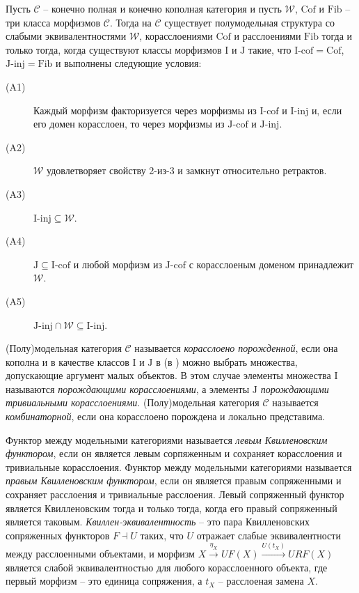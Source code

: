 \documentclass[reqno]{amsart}
\theoremstyle{definition}
\theoremstyle{remark}
\newcommand{\cat}[1]{\mathcal{#1}}
\renewcommand{\C}{\cat{C}}
\newcommand{\we}{\mathcal{W}}
\newcommand{\fib}{\mathrm{Fib}}
\newcommand{\cof}{\mathrm{Cof}}
\newcommand{\I}{\mathrm{I}}
\newcommand{\J}{\mathrm{J}}
\newcommand{\class}[2]{#1\text{-}\mathrm{#2}}
\newcommand{\Iinj}[1][\I]{\class{#1}{inj}}
\newcommand{\Icof}[1][\I]{\class{#1}{cof}}
\newcommand{\Jinj}[1][]{\Iinj[\J#1]}
\newcommand{\Jcof}[1][]{\Icof[\J#1]}
\begin{document}
\begin{prop}
Пусть $\C$ -- конечно полная и конечно кополная категория и пусть $\we$, $\cof$ и $\fib$ -- три класса морфизмов $\C$.
Тогда на $\C$ существует полумодельная структура со слабыми эквивалентностями $\we$, корасслоениями $\cof$ и расслоениями $\fib$ тогда и только тогда,
когда существуют классы морфизмов $\I$ и $\J$ такие, что $\Icof = \cof$, $\Jinj = \fib$ и выполнены следующие условия:
\begin{description}
\item[(A1)] Каждый морфизм факторизуется через морфизмы из $\Icof$ и $\Iinj$ и, если его домен корасслоен, то через морфизмы из $\Jcof$ и $\Jinj$.
\item[(A2)] $\we$ удовлетворяет свойству 2-из-3 и замкнут относительно ретрактов.
\item[(A3)] $\Iinj \subseteq \we$.
\item[(A4)] $\J \subseteq \Icof$ и любой морфизм из $\Jcof$ с корасслоеным доменом принадлежит $\we$.
\item[(A5)] $\Jinj \cap \we \subseteq \Iinj$.
\end{description}
\end{prop}

\begin{defn}
(Полу)модельная категория $\C$ называется \emph{корасслоено порожденной}, если она кополна и в качестве классов $\I$ и $\J$ в  (в ) можно выбрать множества, допускающие аргумент малых объектов.
В этом случае элементы множества $\I$ называются \emph{порождающими корасслоениями}, а элементы $\J$ \emph{порождающими тривиальными корасслоениями}.
(Полу)модельная категория $\C$ называется \emph{комбинаторной}, если она корасслоено порождена и локально представима.
\end{defn}

Функтор между модельными категориями называется \emph{левым Квилленовским функтором}, если он является левым сорпяженным и сохраняет корасслоения и тривиальные корасслоения.
Функтор между модельными категориями называется \emph{правым Квилленовским функтором}, если он является правым сопряженными и сохраняет расслоения и тривиальные расслоения.
Левый сопряженный функтор является Квилленовским тогда и только тогда, когда его правый сопряженный является таковым.
\emph{Квиллен-эквивалентность} -- это пара Квилленовских сопряженных функторов $F \dashv U$ таких, что $U$ отражает слабые эквивалентности между расслоенными объектами,
и морфизм $X \xrightarrow{\eta_X} UF(X) \xrightarrow{U(t_X)} URF(X)$ является слабой эквивалентностью для любого корасслоенного объекта, где первый морфизм -- это единица сопряжения, а $t_X$ -- расслоеная замена $X$.
\end{document}
